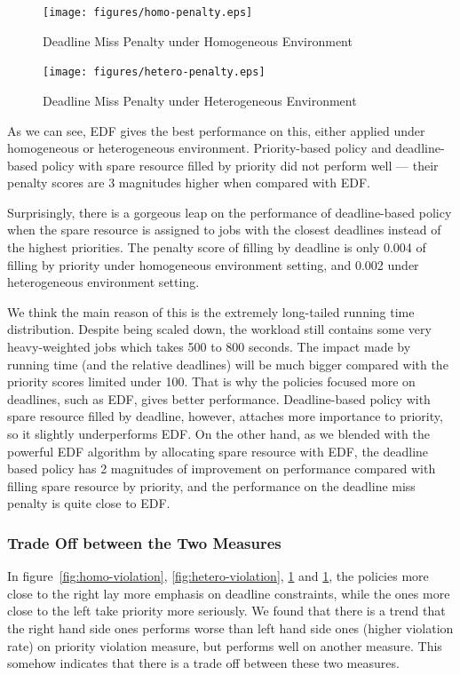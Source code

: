 \begin{figure}[htbp]
  \centering
  \texttt{[image: figures/homo-penalty.eps]}
  \caption{Deadline Miss Penalty under Homogeneous Environment}
  \label{fig:homo-penalty}
\end{figure}

\begin{figure}[htbp]
  \centering
  \texttt{[image: figures/hetero-penalty.eps]}
  \caption{Deadline Miss Penalty under Heterogeneous Environment}
  \label{fig:hetero-penalty}
\end{figure}

As we can see, EDF gives the best performance on this, either applied
under homogeneous or heterogeneous environment.
Priority-based policy and deadline-based policy with spare resource
filled by priority did not perform well --- their penalty scores are 3
magnitudes higher when compared with EDF.

Surprisingly, there is a gorgeous leap on the performance of
deadline-based policy when the spare resource is assigned to jobs with
the closest deadlines instead of the highest priorities.
The penalty score of filling by deadline is only 0.004 of filling by
priority under homogeneous environment setting, and 0.002 under
heterogeneous environment setting.

We think the main reason of this is the extremely long-tailed running
time distribution.
Despite being scaled down, the workload still contains some very
heavy-weighted jobs which takes 500 to 800 seconds.
The impact made by running time (and the relative deadlines) will be
much bigger compared with the priority scores limited under 100.
That is why the policies focused more on deadlines, such as EDF, gives
better performance.
Deadline-based policy with spare resource filled by deadline, however,
attaches more importance to priority, so it slightly underperforms EDF.
On the other hand, as we blended with the powerful EDF algorithm by
allocating spare resource with EDF, the deadline based policy has 2
magnitudes of improvement on performance compared with filling spare
resource by priority, and the performance on the deadline miss penalty
is quite close to EDF.

\subsubsection{Trade Off between the Two Measures}

In
figure~\ref{fig:homo-violation}, \ref{fig:hetero-violation}, \ref{fig:homo-penalty}
and \ref{fig:homo-penalty}, the policies more close to the right lay
more emphasis on deadline constraints, while the ones more close to the
left take priority more seriously.
We found that there is a trend that the right hand side ones performs
worse than left hand side ones (higher violation rate) on priority
violation measure, but performs well on another measure.
This somehow indicates that there is a trade off between these two
measures.

